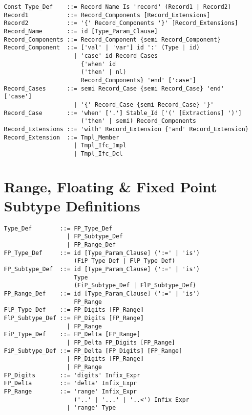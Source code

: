 \syntax\begin{lstlisting}
Const_Type_Def    ::= Record_Name Is 'record' (Record1 | Record2)
Record1           ::= Record_Components [Record_Extensions]
Record2           ::= '{' Record_Components '}' [Record_Extensions]
Record_Name       ::= id [Type_Param_Clause]
Record_Components ::= Record_Component {semi Record_Component}
Record_Component  ::= ['val' | 'var'] id ':' (Type | id)
                    | 'case' id Record_Cases
                      {'when' id 
                      ('then' | nl) 
                      Record_Components} 'end' ['case']
Record_Cases      ::= semi Record_Case {semi Record_Case} 'end' ['case']
                    | '{' Record_Case {semi Record_Case} '}'
Record_Case       ::= 'when' ['.'] Stable_Id ['(' [Extractions] ')']
                      ('then' | semi) Record_Components
Record_Extensions ::= 'with' Record_Extension {'and' Record_Extension}
Record_Extension  ::= Tmpl_Member
                    | Tmpl_Ifc_Impl
                    | Tmpl_Ifc_Dcl
\end{lstlisting}





\section{Range, Floating \& Fixed Point Subtype Definitions}
\label{sec:fl-fi-subtypes}

\syntax\begin{lstlisting}
Type_Def        ::= FP_Type_Def 
                  | FP_Subtype_Def 
                  | FP_Range_Def
FP_Type_Def     ::= id [Type_Param_Clause] (':=' | 'is')
                    (FiP_Type_Def | FlP_Type_Def) 
FP_Subtype_Def  ::= id [Type_Param_Clause] (':=' | 'is') 
                    Type
                    (FiP_Subtype_Def | FlP_Subtype_Def) 
FP_Range_Def    ::= id [Type_Param_Clause] (':=' | 'is') 
                    FP_Range
FlP_Type_Def    ::= FP_Digits [FP_Range]
FlP_Subtype_Def ::= FP_Digits [FP_Range]
                  | FP_Range
FiP_Type_Def    ::= FP_Delta [FP_Range] 
                  | FP_Delta FP_Digits [FP_Range]
FiP_Subtype_Def ::= FP_Delta [FP_Digits] [FP_Range]
                  | FP_Digits [FP_Range]
                  | FP_Range
FP_Digits       ::= 'digits' Infix_Expr
FP_Delta        ::= 'delta' Infix_Expr
FP_Range        ::= 'range' Infix_Expr 
                    ('..' | '...' | '..<') Infix_Expr
                  | 'range' Type
\end{lstlisting}

